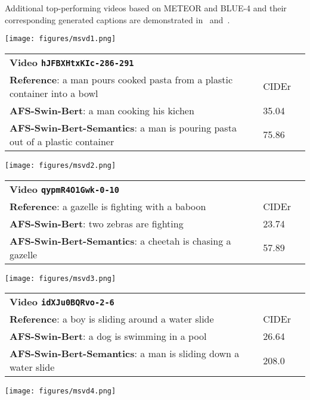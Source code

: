 \documentclass[runningheads,table]{llncs}
\begin{document}
Additional top-performing videos based on METEOR and BLUE-4 and their corresponding generated captions are demonstrated in~ and~.

\begin{figure*}
    {
    \texttt{[image: figures/msvd1.png]} 
    }
 
        \small{
        \begin{tabular}{lll}
        \textbf{Video
        \texttt{hJFBXHtxKIc-286-291}}\\
        \textbf{Reference}: a man pours cooked pasta from a plastic container into a bowl& CIDEr \\
        \textbf{AFS-Swin-Bert}: a man cooking his kichen & 35.04 \\
        \textbf{AFS-Swin-Bert-Semantics}: {a man is pouring pasta out of a plastic container} & 75.86 \\
        \end{tabular}
        }
       \newline
    {
    \texttt{[image: figures/msvd2.png]} 
    }
\small{
        \begin{tabular}{lll}
        \textbf{Video
        \texttt{qypmR4O1Gwk-0-10}}\\
        \textbf{Reference}:  a gazelle is fighting with a baboon & CIDEr \\
        \textbf{AFS-Swin-Bert}:  two zebras are fighting & 23.74 \\
        \textbf{AFS-Swin-Bert-Semantics}:  a cheetah is chasing a gazelle & 57.89 \\
        \end{tabular}
        }
       
    {
    \texttt{[image: figures/msvd3.png]} 
    }
\small{
        \begin{tabular}{lll}
        \textbf{Video
        \texttt{idXJu0BQRvo-2-6}}\\
        \textbf{Reference}: a boy is sliding around a water slide & CIDEr \\
        \textbf{AFS-Swin-Bert}: a dog is swimming in a pool & 26.64 \\
        \textbf{AFS-Swin-Bert-Semantics}: a man is sliding down a water slide & 208.0 \\
        \end{tabular}
        }
        
    {
    \texttt{[image: figures/msvd4.png]} 
    }
 

\end{figure*}
\end{document}
